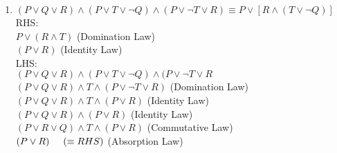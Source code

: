 \documentclass{article}
\begin{document}
\begin{enumerate}
$(Q \wedge R) \hspace{5mm} (\equiv RHS)$ \hspace{11mm} (Absorption Law) \\
\item %
$ (P\vee Q\vee R) \wedge (P \vee T\vee \lnot Q) \wedge (P \vee \lnot T \vee R) \equiv P \vee [R \wedge (T \vee \lnot Q)]$ \\
RHS: \\
$P \vee (R \wedge T)$ \hspace{41mm} (Domination Law) \\
$(P \vee R) $ \hspace{48mm} (Identity Law) \\
LHS: \\
$ (P\vee Q\vee R) \wedge (P \vee T\vee \lnot Q) \wedge (P \vee \lnot T \vee R $ \\
$ (P\vee Q\vee R) \wedge T \wedge (P \vee \lnot T \vee R) $ \hspace{10mm} (Domination Law) \\
$ (P\vee Q\vee R) \wedge T \wedge (P \vee R) $ \hspace{19mm} (Identity Law) \\
$ (P\vee Q\vee R) \wedge (P \vee R) $ \hspace{25mm} (Identity Law) \\
$ (P\vee R\vee Q) \wedge T \wedge (P \vee R) $ \hspace{19mm} (Commutative Law) \\
$ (P \vee R) \hspace{5mm}(\equiv RHS) $ \hspace{28mm} (Absorption Law) \\

\end{enumerate}
\end{document}

